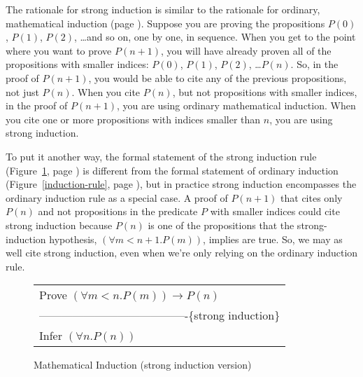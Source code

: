 \label{strong-induction-rationale}
The rationale for
strong induction is similar to
the rationale for ordinary, mathematical induction (page \pageref{induction-rationale}).
Suppose you are proving the propositions
$P(0)$, $P(1)$, $P(2)$, \dots and so on,
one by one, in sequence.
When you get to the point where you want to prove $P(n+1)$,
you will have already proven all of the propositions
with smaller indices:
$P(0)$, $P(1)$, $P(2)$, \dots $P(n)$.
So, in the proof of $P(n+1)$, you would be able to
cite any of the previous propositions, not just $P(n)$.
When you cite $P(n)$, but not propositions with smaller indices,
in the proof of $P(n+1)$, you are using ordinary mathematical induction.
When you cite one or more propositions with indices smaller than $n$,
you are using strong induction.

To put it another way, the formal statement of the strong induction rule
(Figure~\ref{strong-induction-rule}, page \pageref{strong-induction-rule})
is different from the formal statement of ordinary induction
(Figure~\ref{induction-rule}, page \pageref{induction-rule}), but
in practice strong induction encompasses the ordinary induction rule
as a special case. A proof of $P(n+1)$ that cites only $P(n)$
and not propositions in the predicate $P$ with smaller indices
could cite strong induction because $P(n)$ is one of the propositions
that the strong-induction hypothesis, $(\forall m<n+1.P(m))$, implies are true.
So, we may as well cite strong induction, even when we're only relying
on the ordinary induction rule.

\begin{figure}
\begin{center}
\begin{tabular}{l}
Prove $(\forall m<n.P(m))\rightarrow P(n)$ \\
----------------------------------------\{strong induction\}\\
Infer $(\forall n.P(n))$
\end{tabular}
\end{center}
\caption{Mathematical Induction (strong induction version)}
\label{strong-induction-rule}
\end{figure}

